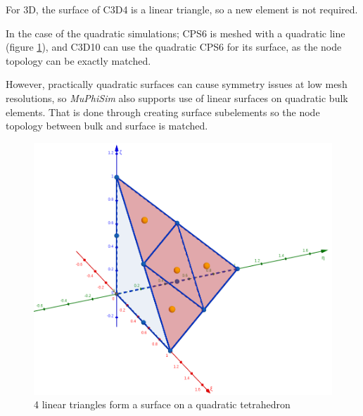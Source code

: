 \documentclass[oneside,11pt,times]{book}
\begin{document}
For 3D, the surface of C3D4 is a linear triangle, so a new element is not required.

In the case of the quadratic simulations; CPS6 is meshed with a quadratic line (figure \ref{figureQuadLin}), and C3D10 can use the quadratic CPS6 for its surface, as the node topology can be exactly matched.

However, practically quadratic surfaces can cause symmetry issues at low mesh resolutions, so \textit{MuPhiSim} also supports use of linear surfaces on quadratic bulk elements. That is done through creating surface subelements so the node topology between bulk and surface is matched. 

\begin{figure}[!htb]
\centering
 \includegraphics[scale=0.4]{imgs/SpatialDiscretisation/LinSurf.png}
 \caption{4 linear triangles form a surface on a quadratic tetrahedron}
 \label{figureQuadLin}
\end{figure}



\end{document}
